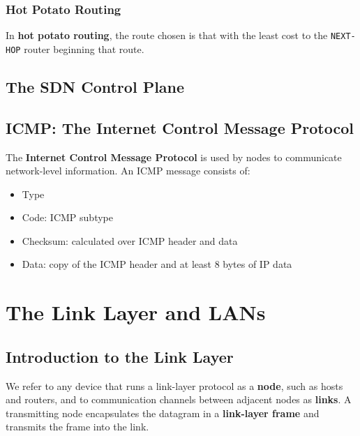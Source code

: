 \documentclass{article}
\begin{document}
\subsubsection*{Hot Potato Routing}
In \textbf{hot potato routing}, the route chosen is that with the least cost to the \verb|NEXT-HOP| router beginning that route. 

\subsection{The SDN Control Plane}

\subsection{ICMP: The Internet Control Message Protocol}
The \textbf{Internet Control Message Protocol} is used by nodes to communicate network-level information. An ICMP message consists of:
\begin{itemize}
    \item Type
    \item Code: ICMP subtype
    \item Checksum: calculated over ICMP header and data
    \item Data: copy of the ICMP header and at least $8$ bytes of IP data
\end{itemize}

\newpage


\section{The Link Layer and LANs}
\subsection{Introduction to the Link Layer}
We refer to any device that runs a link-layer protocol as a \textbf{node}, such as hosts and routers, and to communication channels between adjacent nodes as \textbf{links}.
A transmitting node encapsulates the datagram in a \textbf{link-layer frame} and transmits the frame into the link.
\end{document}
